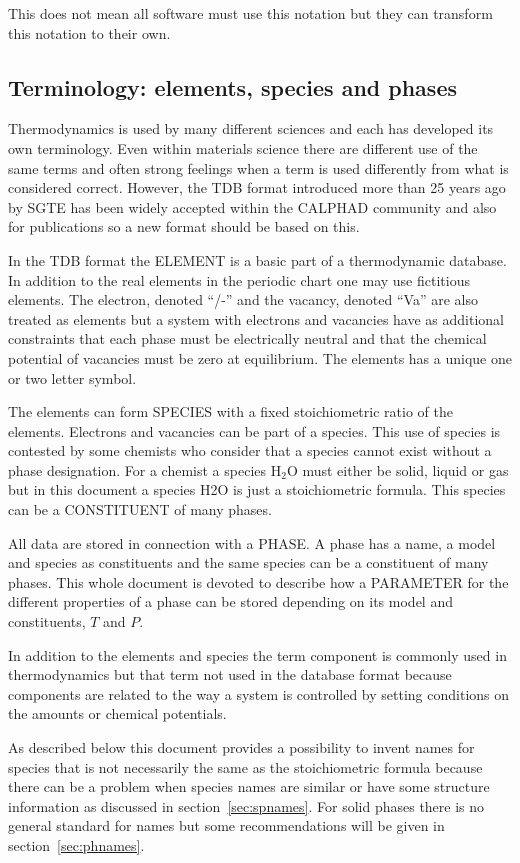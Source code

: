 \documentclass[12pt]{article}
\begin{document}
This does not mean all software must use this notation but they can
transform this notation to their own.

\subsection{Terminology: elements, species and phases}

Thermodynamics is used by many different sciences and each has
developed its own terminology.  Even within materials science there
are different use of the same terms and often strong feelings when a
term is used differently from what is considered correct.  However,
the TDB format introduced more than 25 years ago by SGTE has been
widely accepted within the CALPHAD community and also for publications
so a new format should be based on this.

In the TDB format the ELEMENT is a basic part of a thermodynamic
database.  In addition to the real elements in the periodic chart one
may use fictitious elements.  The electron, denoted ``/-'' and the
vacancy, denoted ``Va'' are also treated as elements but a system with
electrons and vacancies have as additional constraints that each phase
must be electrically neutral and that the chemical potential of
vacancies must be zero at equilibrium.  The elements has a unique one
or two letter symbol.

The elements can form SPECIES with a fixed stoichiometric ratio of the
elements.  Electrons and vacancies can be part of a species.  This use
of species is contested by some chemists who consider that a species
cannot exist without a phase designation.  For a chemist a species
H$_2$O must either be solid, liquid or gas but in this document a
species H2O is just a stoichiometric formula.  This species can be a
CONSTITUENT of many phases.

All data are stored in connection with a PHASE.  A phase has a name, a
model and species as constituents and the same species can be a
constituent of many phases.  This whole document is devoted to
describe how a PARAMETER for the different properties of a phase can
be stored depending on its model and constituents, $T$ and $P$.

In addition to the elements and species the term component is commonly
used in thermodynamics but that term not used in the database format
because components are related to the way a system is controlled by
setting conditions on the amounts or chemical potentials.

As described below this document provides a possibility to invent
names for species that is not necessarily the same as the
stoichiometric formula because there can be a problem when species
names are similar or have some structure information as discussed in
section~\ref{sec:spnames}.  For solid phases there is no general
standard for names but some recommendations will be given in
section~\ref{sec:phnames}.
\end{document}
